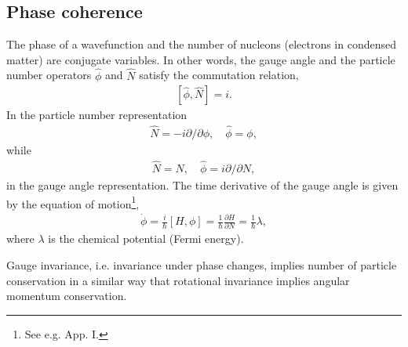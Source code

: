 \subsection{Phase coherence}\label{C3AppD}
The phase of a wavefunction and the number of nucleons (electrons in condensed matter) are conjugate variables. In other words, the gauge angle and the particle number operators $\hat{\phi}$ and $\hat N$ satisfy the commutation relation,
  \begin{align}\label{eq3.7.8}
\left[\hat{\phi},\hat{N}\right]=i.
    \end{align}
In the particle number representation
  \begin{align}\label{eq3.7.9}
\hat N=-i\partial/\partial \phi,\quad \hat \phi=\phi,
    \end{align}
while
  \begin{align}\label{eq3.7.10}
\hat N=N,\quad \hat\phi=i\partial/\partial N,
    \end{align}
in the gauge angle representation. The time derivative of the gauge angle is given by the equation of motion\footnote{See e.g. \cite{Brink:05} App. I.},
  \begin{align}\label{eq3.7.11}
  \dot{\phi}=\frac{i}{\hbar}\left[H,\phi \right]=\frac{1}{\hbar}\frac{\partial H}{\partial N}=\frac{1}{\hbar}\lambda,
    \end{align}
where $\lambda$ is the chemical potential (Fermi energy).







 Gauge invariance, i.e. invariance under phase changes, implies number of particle conservation in a similar way that rotational invariance implies angular momentum conservation.

